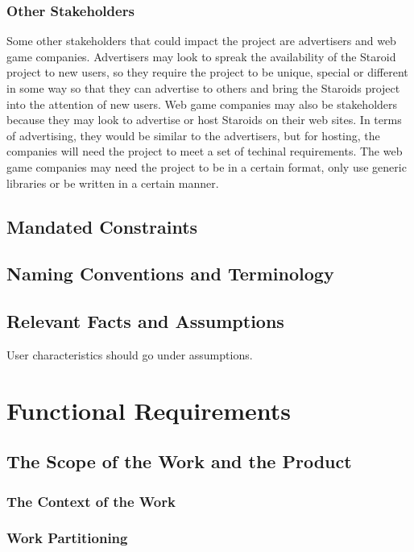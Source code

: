 \documentclass[12pt, titlepage]{article}
\begin{document}
\subsubsection{Other Stakeholders}
Some other stakeholders that could impact the project are advertisers and web game companies. Advertisers may look to spreak the availability of the Staroid project to new users, so they require the project to be unique, special or different in some way so that they can advertise to others and bring the Staroids project into the attention of new users. Web game companies may also be stakeholders because they may look to advertise or host Staroids on their web sites. In terms of advertising, they would be similar to the advertisers, but for hosting, the companies will need the project to meet a set of techinal requirements. The web game companies may need the project to be in a certain format, only use generic libraries or be written in a certain manner.

\subsection{Mandated Constraints}

\subsection{Naming Conventions and Terminology}

\subsection{Relevant Facts and Assumptions}

User characteristics should go under assumptions.

\section{Functional Requirements}

\subsection{The Scope of the Work and the Product}

\subsubsection{The Context of the Work}

\subsubsection{Work Partitioning}
\end{document}
